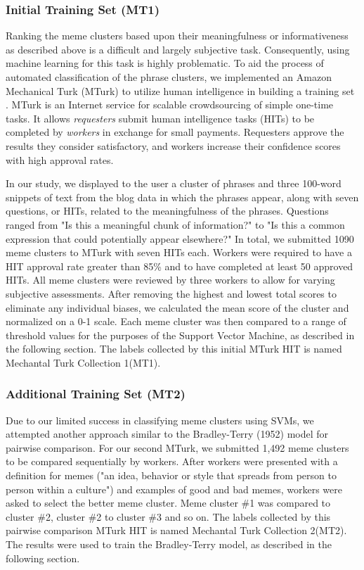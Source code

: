\documentclass{sig-alternate}
\begin{document}
\subsubsection{Initial Training Set (MT1)}
Ranking the meme clusters based upon their meaningfulness or informativeness as described above is a difficult and largely subjective task. Consequently, using machine learning for this task is highly problematic. To aid the process of automated classification of the phrase clusters, we implemented an Amazon Mechanical Turk (MTurk) to utilize human intelligence in building a training set \cite{Barr2006}. MTurk is an Internet service for scalable crowdsourcing of simple one-time tasks. It allows \emph{requesters} submit human intelligence tasks (HITs) to be completed by \emph{workers} in exchange for small payments. Requesters approve the results they consider satisfactory, and workers increase their confidence scores with high approval rates.

In our study, we displayed to the user a cluster of phrases and three 100-word snippets of text from the blog data in which the phrases appear, along with seven questions, or HITs, related to the meaningfulness of the phrases. Questions ranged from "Is this a meaningful chunk of information?" to "Is this a common expression that could potentially appear elsewhere?"  In total, we submitted 1090 meme clusters to MTurk with seven HITs each. Workers were required to have a HIT approval rate greater than 85\% and to have completed at least 50 approved HITs.
  All meme clusters were reviewed by three workers to allow for varying subjective assessments.  After removing the highest and lowest total scores to eliminate any individual biases, we calculated the mean score of the cluster and normalized on a 0-1 scale. Each meme cluster was then compared to a range of threshold values for the purposes of the Support Vector Machine, as described in the following section. The labels collected by this initial MTurk HIT is named Mechantal Turk Collection 1(MT1).

\subsubsection{Additional Training Set (MT2)}
Due to our limited success in classifying meme clusters using SVMs, we attempted another approach similar to the Bradley-Terry (1952) model for pairwise comparison.  For our second MTurk, we submitted 1,492 meme clusters to be compared sequentially by workers. After workers were presented with a definition for memes ("an idea, behavior or style that spreads from person to person within a culture") and examples of good and bad memes, workers were asked to select the better meme cluster. Meme cluster \#1 was compared to cluster \#2, cluster \#2 to cluster \#3 and so on. The labels collected by this pairwise comparison MTurk HIT is named Mechantal Turk Collection 2(MT2). The results were used to train the Bradley-Terry model, as described in the following section. 
\end{document}
